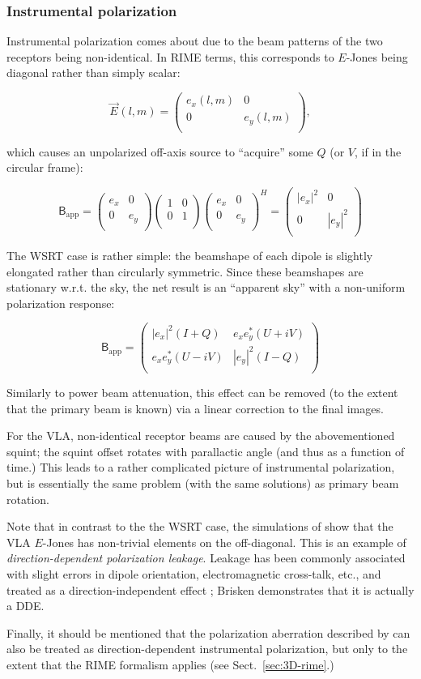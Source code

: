 \documentclass[]{aa}
\newcommand{\matrixtt}[4]{\left( \begin{array}{cc}#1&#2\\#3&#4\\\end{array} \right)}
\newcommand{\herm}{H}
\newcommand{\jones}[2]{\vec {#1}_{#2}}
\newcommand{\coh}[2]{\mathsf{{#1}}_{{#2}}}
\begin{document}
\subsubsection{Instrumental polarization}

Instrumental polarization comes about due to the beam patterns of the two receptors being non-identical. In RIME terms, this corresponds to $E$-Jones being diagonal rather than simply scalar:

\[
\jones{E}{}(l,m) = \matrixtt{e_x(l,m)}{0}{0}{e_y(l,m)},
\]

which causes an unpolarized off-axis source to ``acquire'' some $Q$ (or $V$, if in the circular frame):

\[
\coh{B}{\mathrm{app}} = \matrixtt{e_x}{0}{0}{e_y} 
\matrixtt{1}{0}{0}{1}
\matrixtt{e_x}{0}{0}{e_y}^\herm =
\matrixtt{|e_x|^2}{0}{0}{|e_y|^2}
\]

The WSRT case is rather simple: the beamshape of each dipole is slightly elongated rather than circularly symmetric. Since these beamshapes are stationary w.r.t. the sky, the net result is an ``apparent sky'' with a non-uniform polarization response: 

\[
\coh{B}{\mathrm{app}} = \matrixtt{|e_x|^2(I+Q)}{e_x e^*_y(U+iV)}{e_x e^*_y(U-iV)}{|e_y|^2(I-Q)}
\]

Similarly to power beam attenuation, this effect can be removed (to the extent that the primary beam is known) via a linear correction to the final images.

For the VLA, non-identical receptor beams are caused by the abovementioned squint; the squint offset rotates with parallactic angle (and thus as a function of time.) This leads to a rather complicated picture of instrumental polarization, but is essentially the same problem (with the same solutions) as primary beam rotation.

Note that in contrast to the the WSRT case, the simulations of \citet{Brisken:VLA-beam} show that the VLA $E$-Jones has non-trivial elements on the off-diagonal. This is an example of \emph{direction-dependent polarization leakage}. Leakage has been commonly associated with slight errors in dipole orientation, electromagnetic cross-talk, etc., and treated as a direction-independent effect \citep{ME1,JEN:note185}; Brisken demonstrates that it is actually a DDE.

Finally, it should be mentioned that the polarization aberration described by \citet{Carozzi:ME3D} can also be treated as direction-dependent instrumental polarization, but only to the extent that the RIME formalism applies (see Sect.~\ref{sec:3D-rime}.) 
\end{document}
